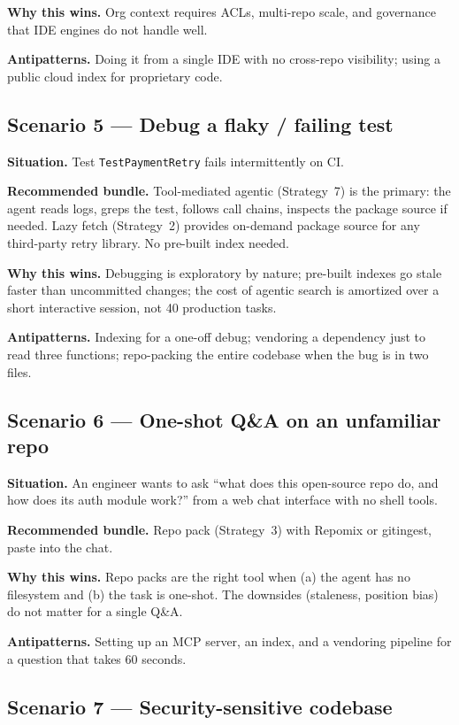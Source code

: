 \documentclass[
  11pt,
  letterpaper,
  numbers=noendperiod,
  parskip=half]{scrartcl}
\begin{document}
\textbf{Why this wins.} Org context requires ACLs, multi-repo scale,
and governance that IDE engines do not handle well.

\textbf{Antipatterns.} Doing it from a single IDE with no cross-repo
visibility; using a public cloud index for proprietary code.

\subsection{Scenario 5 --- Debug a flaky / failing
test}\label{sec-fit-scenario-debug}

\textbf{Situation.} Test \texttt{TestPaymentRetry} fails intermittently
on CI.

\textbf{Recommended bundle.} Tool-mediated agentic (Strategy~7) is the
primary: the agent reads logs, greps the test, follows call chains,
inspects the package source if needed. Lazy fetch (Strategy~2)
provides on-demand package source for any third-party retry library.
No pre-built index needed.

\textbf{Why this wins.} Debugging is exploratory by nature; pre-built
indexes go stale faster than uncommitted changes; the cost of agentic
search is amortized over a short interactive session, not 40
production tasks.

\textbf{Antipatterns.} Indexing for a one-off debug; vendoring a
dependency just to read three functions; repo-packing the entire
codebase when the bug is in two files.

\subsection{Scenario 6 --- One-shot Q\&A on an unfamiliar
repo}\label{sec-fit-scenario-oneshot}

\textbf{Situation.} An engineer wants to ask ``what does this
open-source repo do, and how does its auth module work?'' from a web
chat interface with no shell tools.

\textbf{Recommended bundle.} Repo pack (Strategy~3) with Repomix or
gitingest, paste into the chat.

\textbf{Why this wins.} Repo packs are the right tool when (a) the
agent has no filesystem and (b) the task is one-shot. The downsides
(staleness, position bias) do not matter for a single Q\&A.

\textbf{Antipatterns.} Setting up an MCP server, an index, and a
vendoring pipeline for a question that takes 60 seconds.

\subsection{Scenario 7 --- Security-sensitive
codebase}\label{sec-fit-scenario-security}
\end{document}
